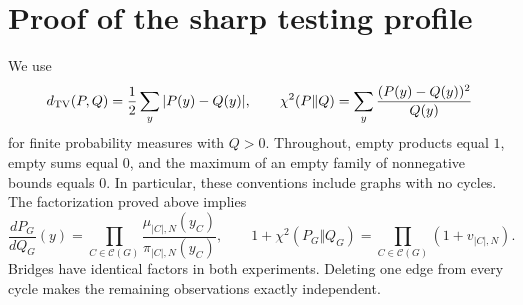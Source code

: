 \section{Proof of the sharp testing profile}\label{sec:testing}
We use
\[
d_{\mathrm{TV}}(P,Q)=\frac12\sum_y|P(y)-Q(y)|,\qquad
\chi^2(P\Vert Q)=\sum_y\frac{(P(y)-Q(y))^2}{Q(y)}
\]
for finite probability measures with $Q>0$. Throughout, empty products equal
$1$, empty sums equal $0$, and the maximum of an empty family of nonnegative
bounds equals $0$. In particular, these conventions include graphs with no
cycles. The factorization proved above implies
\begin{equation}\label{eq:factor}
\frac{dP_G}{dQ_G}(y)=
\prod_{C\in\mathcal C(G)}
\frac{\mu_{|C|,N}(y_C)}{\pi_{|C|,N}(y_C)},\qquad
1+\chi^2(P_G\Vert Q_G)=
\prod_{C\in\mathcal C(G)}(1+v_{|C|,N}).
\end{equation}
Bridges have identical factors in both experiments. Deleting one edge from every
cycle makes the remaining observations exactly independent.

